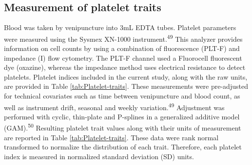\documentclass[11pt,twoside]{bristolthesis}
\begin{document}
\hypertarget{measurement-of-platelet-traits}{%
\subsection{Measurement of platelet traits}\label{measurement-of-platelet-traits}}

Blood was taken by venipuncture into 3mL EDTA tubes. Platelet parameters were measured using the Sysmex XN-1000 instrument.\textsuperscript{49} This analyzer provides information on cell counts by using a combination of fluorescence (PLT-F) and impedance (I) flow cytometry. The PLT-F channel used a Fluorocell fluorescent dye (oxazine), whereas the impedance method uses electrical resistance to detect platelets. Platelet indices included in the current study, along with the raw units, are provided in Table \ref{tab:Platelet-traits}. These measurements were pre-adjusted for technical covariates such as time between venipuncture and blood count, as well as instrument drift, seasonal and weekly variation.\textsuperscript{49} Adjustment was performed with cyclic, thin-plate and P-splines in a generalized additive model (GAM).\textsuperscript{50} Resulting platelet trait values along with their units of measurement are reported in Table \ref{tab:Platelet-traits}. These data were rank normal transformed to normalize the distribution of each trait. Therefore, each platelet index is measured in normalized standard deviation (SD) units.
\end{document}
